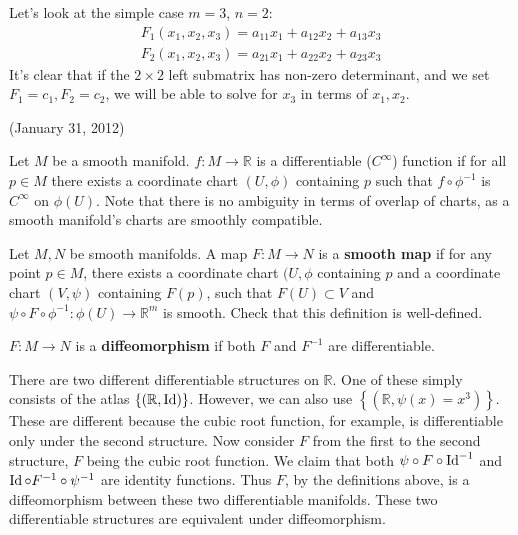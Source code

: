 \documentclass{mathnotes}
\begin{document}
\begin{exmp}
Let's look at the simple case $m=3$, $n=2$:
\begin{align*}
    F_1(x_1,x_2,x_3)=a_{11}x_1+a_{12}x_2+a_{13}x_3\\
    F_2(x_1,x_2,x_3)=a_{21}x_1+a_{22}x_2+a_{23}x_3
\end{align*}
It's clear that if the $2\times2$ left submatrix has non-zero determinant, and we set $F_1=c_1,F_2=c_2$, we will be able to solve for $x_3$ in terms of $x_1,x_2$.
\end{exmp}

(January 31, 2012)
\begin{defn}
    Let $M$ be a smooth manifold. $f:M\to\mathbb{R}$ is a differentiable ($C^\infty$) function if for all $p\in M$ there exists a coordinate chart 
    $(U,\phi)$ containing $p$ such that $f\circ \phi^{-1}$ is $C^\infty$ on $\phi(U)$. Note that there is no ambiguity in terms of overlap of charts,
    as a smooth manifold's charts are smoothly compatible.
\end{defn}

\begin{defn}
    Let $M, N$ be smooth manifolds. A map $F:M\to N$ is a \textbf{smooth map} if for any point $p\in M$, there exists a coordinate chart $(U,\phi$ containing
    $p$ and a coordinate chart $(V,\psi)$ containing $F(p)$, such that $F(U)\subset V$ and $\psi\circ F\circ \phi^{-1}:\phi(U)\to\mathbb{R}^m$ is smooth.
    Check that this definition is well-defined.
\end{defn}

\begin{defn}
    $F:M\to N$ is a \textbf{diffeomorphism} if both $F$ and $F^{-1}$ are differentiable.
\end{defn}

\begin{exmp}
    There are two different differentiable structures on $\mathbb{R}$. One of these simply consists of the atlas $\left\{ (\mathbb{R},\operatorname{Id}) \right\}$. However,
    we can also use $\left\{ (\mathbb{R},\psi(x)=x^3) \right\}$. These are different because the cubic root function, for example, is differentiable only under
    the second structure. Now consider $F$ from the first to the second structure, $F$ being the cubic root function. We claim that both $\psi\circ F\circ \operatorname{Id}^{-1}$
    and $\operatorname{Id}\circ F^{-1}\circ \psi^{-1}$ are identity functions. Thus $F$, by the definitions above, is a diffeomorphism between these two differentiable manifolds.
    These two differentiable structures are equivalent under diffeomorphism.
\end{exmp}
\end{document}
